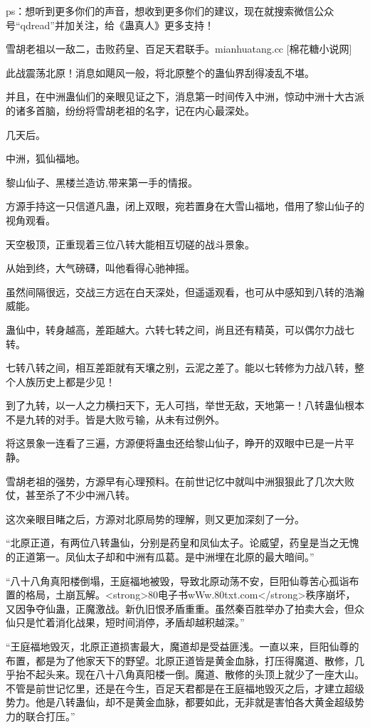 
\begin{this_body}

ps：想听到更多你们的声音，想收到更多你们的建议，现在就搜索微信公众号“qdread”并加关注，给《蛊真人》更多支持！

雪胡老祖以一敌二，击败药皇、百足天君联手。mianhuatang.cc [棉花糖小说网]

此战震荡北原！消息如飓风一般，将北原整个的蛊仙界刮得凌乱不堪。

并且，在中洲蛊仙们的亲眼见证之下，消息第一时间传入中洲，惊动中洲十大古派的诸多首脑，纷纷将雪胡老祖的名字，记在内心最深处。

几天后。

中洲，狐仙福地。

黎山仙子、黑楼兰造访,带来第一手的情报。

方源手持这一只信道凡蛊，闭上双眼，宛若置身在大雪山福地，借用了黎山仙子的视角观看。

天空极顶，正重现着三位八转大能相互切磋的战斗景象。

从始到终，大气磅礴，叫他看得心驰神摇。

虽然间隔很远，交战三方远在白天深处，但遥遥观看，也可从中感知到八转的浩瀚威能。

蛊仙中，转身越高，差距越大。六转七转之间，尚且还有精英，可以偶尔力战七转。

七转八转之间，相互差距就有天壤之别，云泥之差了。能以七转修为力战八转，整个人族历史上都是少见！

到了九转，以一人之力横扫天下，无人可挡，举世无敌，天地第一！八转蛊仙根本不是九转的对手。皆是大败亏输，从未有过例外。

将这景象一连看了三遍，方源便将蛊虫还给黎山仙子，睁开的双眼中已是一片平静。

雪胡老祖的强势，方源早有心理预料。在前世记忆中就叫中洲狠狠此了几次大败仗，甚至杀了不少中洲八转。

这次亲眼目睹之后，方源对北原局势的理解，则又更加深刻了一分。

“北原正道，有两位八转蛊仙，分别是药皇和凤仙太子。论威望，药皇是当之无愧的正道第一。凤仙太子却和中洲有瓜葛。是中洲埋在北原的最大暗间。”

“八十八角真阳楼倒塌，王庭福地被毁，导致北原动荡不安，巨阳仙尊苦心孤诣布置的格局，土崩瓦解。<strong>80电子书wWw.80txt.com</strong>秩序崩坏，又因争夺仙蛊，正魔激战。新仇旧恨矛盾重重。虽然秦百胜举办了拍卖大会，但众仙只是忙着消化战果，短时间消停，矛盾却越积越深。”

“王庭福地毁灭，北原正道损害最大，魔道却是受益匪浅。一直以来，巨阳仙尊的布置，都是为了他家天下的野望。北原正道皆是黄金血脉，打压得魔道、散修，几乎抬不起头来。现在八十八角真阳楼一倒。魔道、散修的头顶上就少了一座大山。不管是前世记忆里，还是在今生，百足天君都是在王庭福地毁灭之后，才建立超级势力。他是八转蛊仙，却不是黄金血脉，都要如此，无非就是害怕各大黄金超级势力的联合打压。”


\end{this_body}
